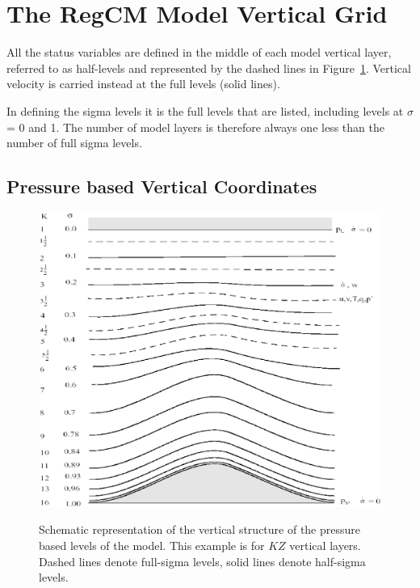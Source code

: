 \section{The \ac{RegCM} Model Vertical Grid}

All the status variables are defined in the middle of each model vertical layer,
referred to as half-levels and represented by the dashed lines in
Figure~\ref{sigma_levels}. Vertical velocity is carried instead at the full
levels (solid lines).

In defining the sigma levels it is the full levels that are
listed, including levels at $\sigma$ = 0 and 1. The number of model layers is
therefore always one less than the number of full sigma levels.

\subsection{Pressure based Vertical Coordinates}

\begin{figure}
\begin{center}
\resizebox{3.5in}{!}
{\includegraphics{sigma_levels.eps}}
\caption{Schematic representation of the vertical structure of the pressure
based levels of the model.
This example is for $KZ$ vertical layers. Dashed lines denote full-sigma levels,
solid lines denote half-sigma levels.}
\label{sigma_levels}
\end{center}
\end{figure}

